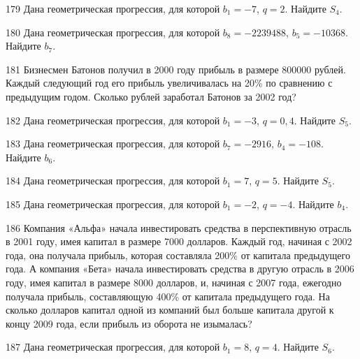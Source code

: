\documentclass[4apaper]{article}
\begin{document}
\begin{taskBN}{179}
Дана геометрическая прогрессия, для которой $b_1 = -7$, $q=2$. Найдите $S_{4}$.
\end{taskBN}

\begin{taskBN}{180}
Дана геометрическая прогрессия, для которой $b_{8} = -2239488$, $b_{5}=-10368$. Найдите $b_{7}$.
\end{taskBN}

\begin{taskBN}{181}
Бизнесмен Батонов получил в 2000 году прибыль в размере 800000 рублей. Каждый следующий год его прибыль увеличивалась на 20\% по сравнению с предыдущим годом. Сколько рублей заработал Батонов за 2002 год?
\end{taskBN}

\begin{taskBN}{182}
Дана геометрическая прогрессия, для которой $b_1 = -3$, $q=0,4$. Найдите $S_{5}$.
\end{taskBN}

\begin{taskBN}{183}
Дана геометрическая прогрессия, для которой $b_{7} = -2916$, $b_{4}=-108$. Найдите $b_{6}$.
\end{taskBN}

\begin{taskBN}{184}
Дана геометрическая прогрессия, для которой $b_1 = 7$, $q=5$. Найдите $S_{5}$.
\end{taskBN}

\begin{taskBN}{185}
Дана геометрическая прогрессия, для которой $b_1 = -2$, $q=-4$. Найдите $b_{4}$.
\end{taskBN}

\begin{taskBN}{186}
Компания «Альфа» начала инвестировать средства в перспективную отрасль в 2001 году, имея капитал в размере 7000 долларов. Каждый год, начиная с 2002 года, она получала прибыль, которая составляла 200\% от капитала предыдущего года. А компания «Бета» начала инвестировать средства в другую отрасль в 2006 году, имея капитал в размере 8000 долларов, и, начиная с 2007 года, ежегодно получала прибыль, составляющую 400\% от капитала предыдущего года. На сколько долларов капитал одной из компаний был больше капитала другой к концу 2009 года, если прибыль из оборота не изымалась?
\end{taskBN}

\begin{taskBN}{187}
Дана геометрическая прогрессия, для которой $b_1 = 8$, $q=4$. Найдите $S_{6}$.
\end{taskBN}
\end{document}
